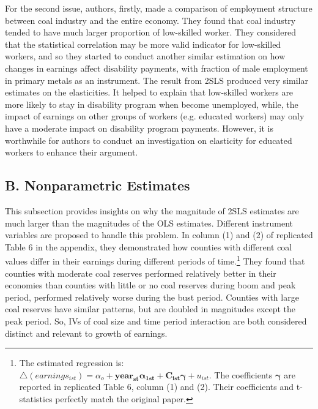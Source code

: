 \documentclass{article} %
\begin{document}
For the second issue, authors, firstly, made a comparison of employment structure between coal industry and the entire economy. They found that coal industry tended to have much larger proportion of low-skilled worker. They considered that the statistical correlation may be more valid indicator for low-skilled workers, and so they started to conduct another similar estimation on how changes in earnings affect disability payments, with fraction of male employment in primary metals as an instrument. The result from 2SLS produced very similar estimates on the elasticities. It helped to explain that low-skilled workers are more likely to stay in disability program when become unemployed, while, the impact of earnings on other groups of workers (e.g. educated workers) may only have a moderate impact on disability program payments. However, it is worthwhile for authors to conduct an investigation on elasticity for educated workers to enhance their argument. 

\subsection{B. Nonparametric Estimates}
This subsection provides insights on why the magnitude of 2SLS estimates are much larger than the magnitudes of the OLS estimates. Different instrument variables are proposed to handle this problem.  
In column (1) and (2) of replicated Table 6 in the appendix, they demonstrated how counties with different coal values differ in their earnings during different periods of time.\footnote{The estimated regression is: $\triangle(earnings_{ist}) = \alpha_o + \bm{year_{st} \alpha_{1st}} + \bm{C_{ist} \gamma} + u_{ist} $. The coefficients $\bm{\gamma}$ are reported in replicated Table 6, column (1) and (2). Their coefficients and t-statistics perfectly match the original paper.} 
They found that counties with moderate coal reserves performed relatively better in their economies than counties with little or no coal reserves during boom and peak period, performed relatively worse during the bust period. Counties with large coal reserves have similar patterns, but are doubled in magnitudes except the peak period. So, IVs of coal size and time period interaction are both considered distinct and relevant to growth of earnings. 
\end{document}
